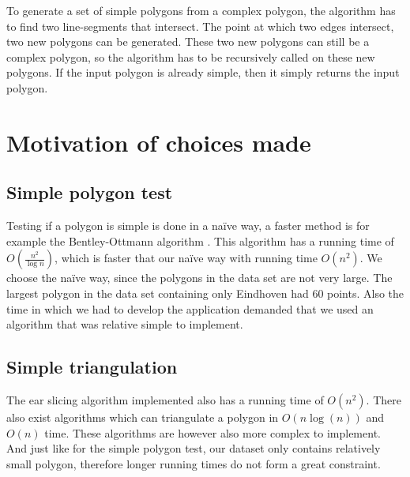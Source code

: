 To generate a set of simple polygons from a complex polygon, the algorithm has to find two line-segments that intersect. The point at which two edges intersect, two new polygons can be generated. These two new polygons can still be a complex polygon, so the algorithm has to be recursively called on these new polygons. If the input polygon is already simple, then it simply returns the input polygon.

\section{Motivation of choices made}
\label{sec:MotivationOfChoicesMade}
\subsection{Simple polygon test}
\label{subsec:SimplePolygonTest}
Testing if a polygon is simple is done in a naïve way, a faster method is for example the Bentley-Ottmann algorithm \cite{Bentley79}. This algorithm has a running time of $O(\frac{n^2}{\log{n}})$, which is faster that our naïve way with running time $O(n^2)$. We choose the naïve way, since the polygons in the data set are not very large. The largest polygon in the data set containing only Eindhoven had 60 points. Also the time in which we had to develop the application demanded that we used an algorithm that was relative simple to implement.

\subsection{Simple triangulation}
\label{subsec:SimpleTriangulation}
The ear slicing algorithm implemented also has a running time of $O(n^2)$. There also exist algorithms which can triangulate a polygon in $O(n\log(n))$ and $O(n)$ time. These algorithms are however also more complex to implement. And just like for the simple polygon test, our dataset only contains relatively small polygon, therefore longer running times do not form a great constraint.
